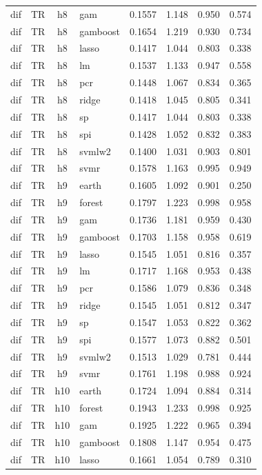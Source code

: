\begin{ThreePartTable}
\begin{longtable}[t]{llclcccc}
dif & TR & h8 & gam & 0.1557 & 1.148 & 0.950 & 0.574\\
dif & TR & h8 & gamboost & 0.1654 & 1.219 & 0.930 & 0.734\\
dif & TR & h8 & lasso & 0.1417 & 1.044 & 0.803 & 0.338\\
dif & TR & h8 & lm & 0.1537 & 1.133 & 0.947 & 0.558\\
dif & TR & h8 & pcr & 0.1448 & 1.067 & 0.834 & 0.365\\
dif & TR & h8 & ridge & 0.1418 & 1.045 & 0.805 & 0.341\\
dif & TR & h8 & sp & 0.1417 & 1.044 & 0.803 & 0.338\\
dif & TR & h8 & spi & 0.1428 & 1.052 & 0.832 & 0.383\\
dif & TR & h8 & svmlw2 & 0.1400 & 1.031 & 0.903 & 0.801\\
dif & TR & h8 & svmr & 0.1578 & 1.163 & 0.995 & 0.949\\
\addlinespace
dif & TR & h9 & earth & 0.1605 & 1.092 & 0.901 & 0.250\\
dif & TR & h9 & forest & 0.1797 & 1.223 & 0.998 & 0.958\\
dif & TR & h9 & gam & 0.1736 & 1.181 & 0.959 & 0.430\\
dif & TR & h9 & gamboost & 0.1703 & 1.158 & 0.958 & 0.619\\
dif & TR & h9 & lasso & 0.1545 & 1.051 & 0.816 & 0.357\\
dif & TR & h9 & lm & 0.1717 & 1.168 & 0.953 & 0.438\\
dif & TR & h9 & pcr & 0.1586 & 1.079 & 0.836 & 0.348\\
dif & TR & h9 & ridge & 0.1545 & 1.051 & 0.812 & 0.347\\
dif & TR & h9 & sp & 0.1547 & 1.053 & 0.822 & 0.362\\
dif & TR & h9 & spi & 0.1577 & 1.073 & 0.882 & 0.501\\
dif & TR & h9 & svmlw2 & 0.1513 & 1.029 & 0.781 & 0.444\\
dif & TR & h9 & svmr & 0.1761 & 1.198 & 0.988 & 0.924\\
\addlinespace
dif & TR & h10 & earth & 0.1724 & 1.094 & 0.884 & 0.314\\
dif & TR & h10 & forest & 0.1943 & 1.233 & 0.998 & 0.925\\
dif & TR & h10 & gam & 0.1925 & 1.222 & 0.965 & 0.394\\
dif & TR & h10 & gamboost & 0.1808 & 1.147 & 0.954 & 0.475\\
dif & TR & h10 & lasso & 0.1661 & 1.054 & 0.789 & 0.310\\

\end{longtable}
\end{ThreePartTable}
